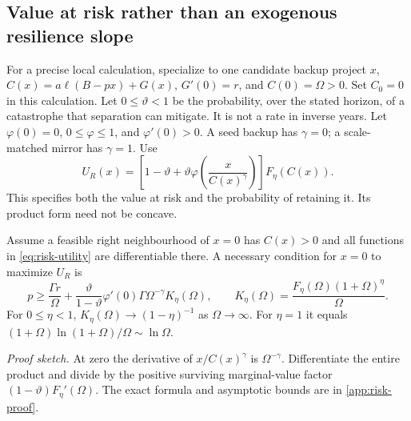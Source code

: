 \subsection{Value at risk rather than an exogenous resilience slope}
For a precise local calculation, specialize to one candidate backup
project $x$, $C(x)=a\ell(B-px)+G(x)$, $G'(0)=r$, and $C(0)=\Omega>0$.
Set $C_0=0$ in this calculation. Let $0\leq\vartheta<1$ be the
probability, over the stated horizon, of a catastrophe that separation
can mitigate. It is not a rate in inverse years. Let $\varphi(0)=0$,
$0\leq\varphi\leq1$, and $\varphi'(0)>0$. A seed backup has
$\gamma=0$; a scale-matched mirror has $\gamma=1$. Use
\begin{equation}
 U_R(x)=\left[1-\vartheta+\vartheta
       \varphi\!\left(\frac{x}{C(x)^\gamma}\right)\right]F_\eta(C(x)).
 \label{eq:risk-utility}
\end{equation}
This specifies both the value at risk and the probability of retaining it.
Its product form need not be concave.

\begin{proposition}
\label{prop:endogenous-risk}
Assume a feasible right neighbourhood of $x=0$ has $C(x)>0$ and all
functions in \cref{eq:risk-utility} are differentiable there. A necessary
condition for $x=0$ to maximize $U_R$ is
\begin{equation}
 p\geq\frac{\Gamma r}{\Omega}
 +\frac{\vartheta}{1-\vartheta}\varphi'(0)
       \Gamma\Omega^{-\gamma}K_\eta(\Omega),\qquad
 K_\eta(\Omega)=\frac{F_\eta(\Omega)(1+\Omega)^\eta}{\Omega}.
 \label{eq:risk-floor}
\end{equation}
For $0\leq\eta<1$, $K_\eta(\Omega)\to(1-\eta)^{-1}$ as
$\Omega\to\infty$. For $\eta=1$ it equals
$(1+\Omega)\ln(1+\Omega)/\Omega\sim\ln\Omega$.
\end{proposition}
\noindent\emph{Proof sketch.}
At zero the derivative of $x/C(x)^\gamma$ is $\Omega^{-\gamma}$.
Differentiate the entire product and divide by the positive surviving
marginal-value factor $(1-\vartheta)F_\eta'(\Omega)$.
The exact formula and asymptotic bounds are in \cref{app:risk-proof}.

